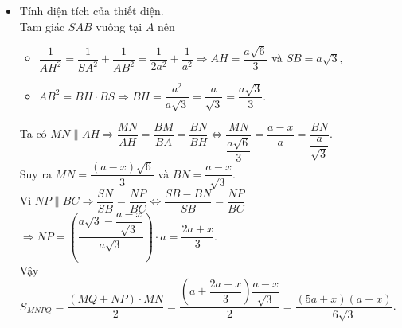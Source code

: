 \begin{bt}
{\begin{itemize}
				Do đó, thiết diện cần tìm là hình thang $MNPQ$ (vì $MQ\parallel AD\parallel BC\parallel NP$).\\
				Ta có $AH\perp SB$, $AH\perp BC$ và $SB\cap BC=B$.\\
				Suy ra $AH\perp (SBC)\Rightarrow AH\perp NP$ (vì $NP\subset (SBC)$).\\
				Mặt khác, $MN\parallel AH$ nên $MN\perp NP$.\\
				Vậy $MNPQ$ là hình thang vuông tại $M$ và $N$.
				\item Tính diện tích của thiết diện.\\
				Tam giác $SAB$ vuông tại $A$ nên 
				\begin{itemize}
				\item $\dfrac{1}{AH^2}=\dfrac{1}{SA^2}+\dfrac{1}{AB^2}=\dfrac{1}{2a^2}+\dfrac{1}{a^2} \Rightarrow AH=\dfrac{a\sqrt{6}}{3}$ và $SB=a\sqrt{3}$,
				\item $AB^2=BH\cdot BS \Rightarrow BH=\dfrac{a^2}{a\sqrt{3}}=\dfrac{a}{\sqrt{3}}=\dfrac{a\sqrt{3}}{3}$.
				\end{itemize} 
				Ta có $MN\|AH \Rightarrow \dfrac{MN}{AH}=\dfrac{BM}{BA}=\dfrac{BN}{BH} \Leftrightarrow \dfrac{MN}{\dfrac{a\sqrt{6}}{3}}=\dfrac{a-x}{a}=\dfrac{BN}{\dfrac{a}{\sqrt{3}}}$.\\
				Suy ra $MN=\dfrac{(a-x)\sqrt{6}}{3}$ và $BN=\dfrac{a-x}{\sqrt{3}}$.\\
				Vì $NP\|BC \Rightarrow \dfrac{SN}{SB}=\dfrac{NP}{BC} \Leftrightarrow \dfrac{SB-BN}{SB}=\dfrac{NP}{BC}$\\
				$ \Rightarrow NP=\left(\dfrac{a\sqrt{3}-\dfrac{a-x}{\sqrt{3}}}{a\sqrt{3}}\right)\cdot a=\dfrac{2a+x}{3}$.\\
				Vậy $S_{MNPQ}=\dfrac{(MQ+NP)\cdot MN}{2}=\dfrac{\left(a+\dfrac{2a+x}{3}\right)\dfrac{a-x}{\sqrt{3}}}{2}=\dfrac{(5a+x)(a-x)}{6\sqrt{3}}$.
			\end{itemize}
		}	
	\end{bt}

